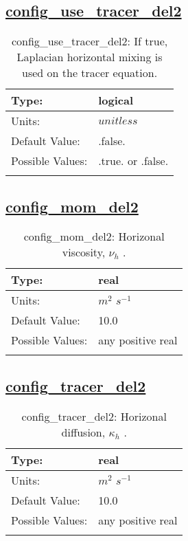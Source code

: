 \subsection[config\_use\_tracer\_del2]{\hyperref[sec:nm_tab_hmix_del2]{config\_use\_tracer\_del2}}
\label{subsec:nm_sec_config_use_tracer_del2}
\begin{center}
\begin{longtable}{| p{2.0in} | p{4.0in} |}
    \hline
    Type: & logical \\
    \hline
    Units: & $unitless$ \\
    \hline
    Default Value: & .false. \\
    \hline
    Possible Values: & .true. or .false. \\
    \hline
    \caption{config\_use\_tracer\_del2: If true, Laplacian horizontal mixing is used on the tracer equation.}
\end{longtable}
\end{center}
\subsection[config\_mom\_del2]{\hyperref[sec:nm_tab_hmix_del2]{config\_mom\_del2}}
\label{subsec:nm_sec_config_mom_del2}
\begin{center}
\begin{longtable}{| p{2.0in} | p{4.0in} |}
    \hline
    Type: & real \\
    \hline
    Units: & $m^2$ $s^{-1}$ \\
    \hline
    Default Value: & 10.0 \\
    \hline
    Possible Values: & any positive real \\
    \hline
    \caption{config\_mom\_del2:  Horizonal viscosity,  $\nu_h$ .}
\end{longtable}
\end{center}
\subsection[config\_tracer\_del2]{\hyperref[sec:nm_tab_hmix_del2]{config\_tracer\_del2}}
\label{subsec:nm_sec_config_tracer_del2}
\begin{center}
\begin{longtable}{| p{2.0in} | p{4.0in} |}
    \hline
    Type: & real \\
    \hline
    Units: & $m^2$ $s^{-1}$ \\
    \hline
    Default Value: & 10.0 \\
    \hline
    Possible Values: & any positive real \\
    \hline
    \caption{config\_tracer\_del2:  Horizonal diffusion,  $\kappa_h$ .}
\end{longtable}
\end{center}
